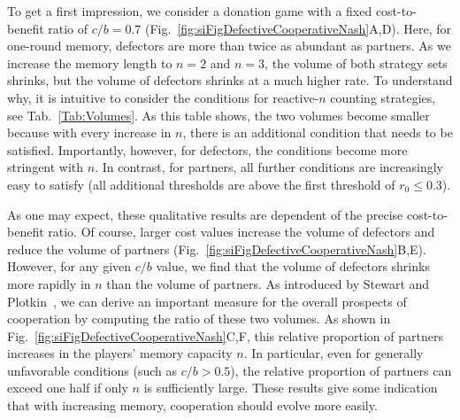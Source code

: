\documentclass[9pt,twoside,lineno]{pnas-new}
\theoremstyle{plainCl1}
\theoremstyle{plainCl2}
\begin{document}
To get a first impression, we consider a donation game with a fixed cost-to-benefit ratio of $c/b\!=\!0.7$ (Fig.~\ref{fig:siFigDefectiveCooperativeNash}A,D). 
Here, for one-round memory, defectors are more than twice as abundant as partners.
As we increase the memory length to $n\!=\!2$ and $n\!=\!3$, the volume of both strategy sets shrinks, but the volume of defectors shrinks at a much higher rate. 
To understand why, it is intuitive to consider the conditions for reactive-$n$ counting strategies, see Tab.~\ref{Tab:Volumes}. 
As this table shows, the two volumes become smaller because with every increase in $n$, there is an additional condition that needs to be satisfied. 
Importantly, however, for defectors, the conditions become more stringent with $n$. 
In contrast, for partners, all further conditions are increasingly easy to satisfy (all additional thresholds are above the first threshold of $r_0\!\le\!0.3$).  

As one may expect, these qualitative results are dependent of the precise cost-to-benefit ratio.
Of course, larger cost values increase the volume of defectors and reduce the volume of partners (Fig.~\ref{fig:siFigDefectiveCooperativeNash}B,E). 
However, for any given $c/b$ value, we find that the volume of defectors shrinks more rapidly in $n$ than the volume of partners. 
As introduced by Stewart and Plotkin~\cite{stewart:scientific:2016}, we can derive an important measure for the overall prospects of cooperation by computing the ratio of these two volumes. 
As shown in Fig.~\ref{fig:siFigDefectiveCooperativeNash}C,F, this relative proportion of partners increases in the players' memory capacity $n$. 
In particular, even for generally unfavorable conditions (such as $c/b\!>\!0.5$), the relative proportion of partners can exceed one half if only $n$ is sufficiently large. 
These results give some indication that with increasing memory, cooperation should evolve more easily. 
\end{document}
